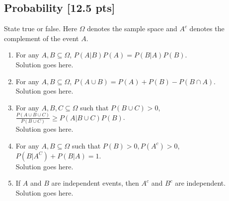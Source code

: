 \documentclass[a4paper]{article}
\theoremstyle{definition}
\newenvironment{soln}{
	\leavevmode\color{blue}\ignorespaces
}{}
\begin{document}
	\subsection{Probability [12.5 pts]}
	State true or false. Here $\Omega$ denotes the sample space and $A^c$ denotes the complement of the event $A$.
	\begin{enumerate}
		\item For any $A, B \subseteq \Omega$, $P(A|B)P(A) = P(B|A)P(B)$.\\
		\begin{soln}  Solution goes here. \end{soln}
		
		\item For any $A, B \subseteq \Omega$, $P(A \cup B) = P(A) + P(B) - P(B \cap A)$.\\         
		\begin{soln}  Solution goes here. \end{soln}
		
		\item For any $A, B, C \subseteq \Omega$ such that $P(B \cup C) > 0$,
		$\frac{P(A \cup B \cup C)}{P(B \cup C)} \geq P(A | B \cup C) P(B)$.\\ 
		\begin{soln}  Solution goes here. \end{soln}
		
		\item For any $A, B\subseteq\Omega$ such that $P(B) > 0, P(A^c) > 0$,
		$P(B|A^C) + P(B|A) = 1$.\\ 
		\begin{soln}  Solution goes here. \end{soln}
		
		\item If $A$ and $B$ are independent events, then $A^{c}$ and $B^{c}$ are independent.\\
		\begin{soln}  Solution goes here. \end{soln}
		
	\end{enumerate}
	
\end{document}
